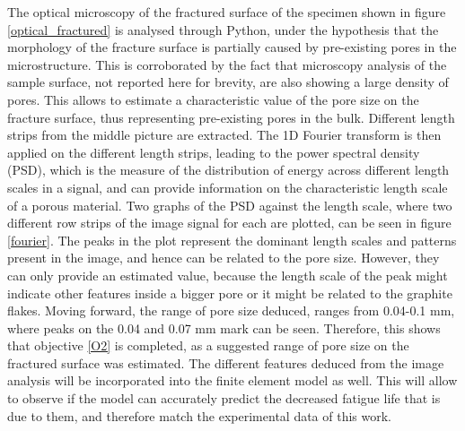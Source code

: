 \documentclass[11pt,a4paper]{article}
\begin{document}
\noindent The optical microscopy of the fractured surface of the specimen shown in figure \ref{optical_fractured} is analysed through Python, under the hypothesis that the morphology of the fracture surface is partially caused by pre-existing pores in the microstructure. This is corroborated by the fact that microscopy analysis of the sample surface, not reported here for brevity, are also showing a large density of pores. This allows to estimate a characteristic value of the pore size on the fracture surface, thus representing pre-existing pores in the bulk. Different length strips from the middle picture are extracted. The 1D Fourier transform is then applied on the different length strips, leading to the power spectral density (PSD), which is the measure of the distribution of energy across different length scales in a signal, and can provide information on the characteristic length scale of a porous material. Two graphs of the PSD against the length scale, where two different row strips of the image signal for each are plotted, can be seen in figure \ref{fourier}. The peaks in the plot represent the dominant length scales and patterns present in the image, and hence can be related to the pore size. However, they can only provide an estimated value, because the length scale of the peak might indicate other features inside a bigger pore or it might be related to the graphite flakes. Moving forward, the range of pore size deduced, ranges from 0.04-0.1 mm, where peaks on the 0.04 and 0.07 mm mark can be seen. Therefore, this shows that objective \ref{O2} is completed, as a suggested range of pore size on the fractured surface was estimated. The different features deduced from the image analysis will be incorporated into the finite element model as well. This will allow to observe if the model can accurately predict the decreased fatigue life that is due to them, and therefore match the experimental data of this work.
\end{document}
